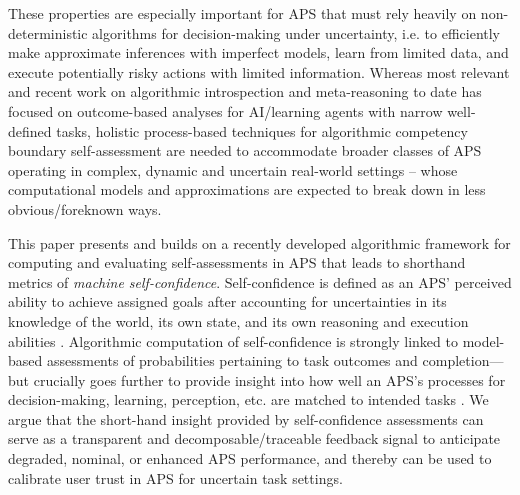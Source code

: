These properties are especially important for APS that must rely heavily on non-deterministic algorithms for decision-making under uncertainty, i.e. to efficiently make approximate inferences with imperfect models, learn from limited data, and execute potentially risky actions with limited information. 
Whereas most relevant and recent work on algorithmic introspection and meta-reasoning to date has focused on outcome-based analyses for  AI/learning agents with narrow well-defined tasks,
holistic process-based techniques for algorithmic competency boundary self-assessment are needed to accommodate broader classes of APS operating in complex, dynamic and uncertain real-world settings -- whose computational models and approximations are expected to break down in less obvious/foreknown ways. 

This paper presents and builds on a recently developed algorithmic framework for computing and evaluating self-assessments in APS that leads to shorthand metrics of \emph{machine self-confidence}. Self-confidence is defined as an APS' perceived ability to achieve assigned goals after accounting for uncertainties in its knowledge of the world, its own state, and its own reasoning and execution abilities \cite{Aitken2016-cv, Aitken2016-fb, Sweet2016-tz}. 
Algorithmic computation of self-confidence is strongly linked to model-based assessments of probabilities pertaining to task outcomes and completion---but crucially goes further to provide insight into how well an APS's processes for decision-making, learning, perception, etc. are matched to intended tasks \cite{Hutchins2015-if}. 
We argue that the short-hand insight provided by self-confidence assessments can serve as a transparent and decomposable/traceable feedback signal to anticipate degraded, nominal, or enhanced APS performance, %
and thereby can be used to calibrate user trust in APS for uncertain task settings. 

